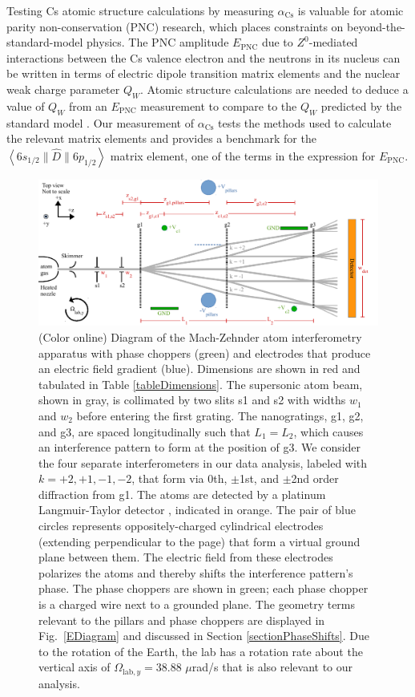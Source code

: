 \documentclass[twocolumn,pra,showpacs,superscriptaddress,longbibliography]{revtex4-1}   %
\newcommand{\brakett}[3]{\left.\left\langle#1\right.\right.\|#2\|\left.\left.#3\right\rangle\right.}
\newcommand{\figref}[1]{Fig.~\ref{#1}}
\newcommand{\acs}{\alpha_{\textrm{Cs}}}
\newcommand{\Omegalab}{\Omega_{\mathrm{lab},y}}
\begin{document}
Testing Cs atomic structure calculations by measuring $\acs$ is valuable for atomic parity non-conservation (PNC) research, which places constraints on beyond-the-standard-model physics. The PNC amplitude $E_{\mathrm{PNC}}$ due to $Z^0$-mediated interactions between the Cs valence electron and the neutrons in its nucleus can be written in terms of electric dipole transition matrix elements and the nuclear weak charge parameter $Q_W$. Atomic structure calculations are needed to deduce a value of $Q_W$ from an $E_{\mathrm{PNC}}$ measurement \cite{Blundell1992,Cho1997,Derevianko2001,Porsev2009} to compare to the $Q_W$ predicted by the standard model \cite{Bouchiat1999,Dzuba2012}. Our measurement of $\acs$ tests the methods used to calculate the relevant matrix elements and provides a benchmark for the $\brakett{6s_{1/2}}{\hat{D}}{6p_{1/2}}$ matrix element, one of the terms in the expression for $E_{\mathrm{PNC}}$.

\begin{figure}
\includegraphics[width=\linewidth,keepaspectratio]{IFM_diagram2.pdf}
\caption{\label{IFMDiagram}(Color online) Diagram of the Mach-Zehnder atom interferometry apparatus with phase choppers (green) and electrodes that produce an electric field gradient (blue). Dimensions are shown in red and tabulated in Table \ref{tableDimensions}.  The supersonic atom beam, shown in gray, is collimated by two slits s1 and s2 with widths $w_1$ and $w_2$ before entering the first grating. 
The nanogratings, g1, g2, and g3, are spaced longitudinally such that $L_1 = L_2$, which causes an interference pattern to form at the position of g3.
We consider the four separate interferometers in our data analysis, labeled with $k=+2,+1,-1,-2$, that form via 0th, $\pm$1st, and $\pm$2nd order diffraction from g1.
The atoms are detected by a platinum Langmuir-Taylor detector \cite{Delhuille2002}, indicated in orange.
The pair of blue circles represents oppositely-charged cylindrical electrodes (extending perpendicular to the page) that form a virtual ground plane between them. The electric field from these electrodes polarizes the atoms and thereby shifts the interference pattern's phase. 
The phase choppers are shown in green; each phase chopper is a charged wire next to a grounded plane. The geometry terms relevant to the pillars and phase choppers are displayed in \figref{EDiagram} and discussed in Section \ref{sectionPhaseShifts}.
Due to the rotation of the Earth, the lab has a rotation rate about the vertical axis of $\Omegalab = 38.88$ $\mu$rad/s that is also relevant to our analysis.  }
\end{figure}
\end{document}
